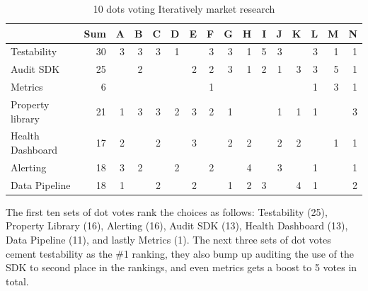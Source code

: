 \begin{table}[htbp!]
 
    \centering
    \small
    \setlength{\tabcolsep}{4pt} %
    \begin{tabular}{lr|rrrrrrrrrrrrrr}
                     &Sum &A  &B  &C  &D  &E  &F  &G  &H  &I  &J &K &L &M &N\\
    \hline     
    Testability         &30 &3  &3  &3  &1  &   &3  &3  &1  &5  &3 &  &3 &1 &1\\
    Audit SDK           &25 &   &2  &   &   &2  &2  &3  &1  &2  &1 &3 &3 &5 &1\\
    Metrics             &6  &   &   &   &   &   &1  &   &   &   &  &  &1 &3 &1\\
    Property library    &21 &1  &3  &3  &2  &3  &2  &1  &   &   &1 &1 &1 &  &3\\
    Health Dashboard    &17 &2  &   &2  &   &3  &   &2  &2  &   &2 &2 &  &1 &1\\
    Alerting            &18 &3  &2  &   &2  &   &2  &   &4  &   &3 &  &1 &  &1\\
    Data Pipeline       &18 &1  &   &2  &   &2  &   &1  &2  &3  &  &4 &1 &  &2\\
         
    \end{tabular}
    \caption{10 dots voting Iteratively market research}
    \label{tab:10dots_voting_iteratively}

\end{table}

The first ten sets of dot votes rank the choices as follows: Testability (25), Property Library (16), Alerting (16), Audit SDK (13), Health Dashboard (13), Data Pipeline (11), and lastly Metrics (1). The next three sets of dot votes cement testability as the \#1 ranking, they also bump up auditing the use of the SDK to second place in the rankings, and even metrics gets a boost to 5 votes in total. 

